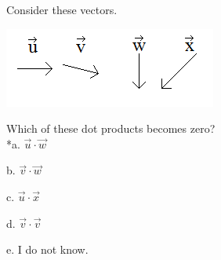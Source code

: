 
Consider these vectors.

\includegraphics[width=2.75038in,height=1.03139in]{../../Images/VectorsQ9.png}

Which of these dot products becomes zero? \\

*a. \(\overrightarrow{u} \cdot \overrightarrow{w}\)

b. \(\overrightarrow{v} \cdot \overrightarrow{w}\)

c. \(\overrightarrow{u} \cdot \overrightarrow{x}\)

d. \(\overrightarrow{v} \cdot \overrightarrow{v}\)

e. I do not know. \\
